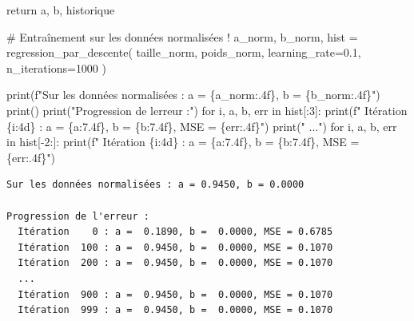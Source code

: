 \documentclass[
  french,
  11pt,
  a4paper,
]{scrbook}
\newenvironment{Shaded}{}{}
\newcommand{\BuiltInTok}[1]{\textcolor[rgb]{0.84,0.23,0.29}{#1}}
\newcommand{\CommentTok}[1]{\textcolor[rgb]{0.42,0.45,0.49}{#1}}
\newcommand{\ControlFlowTok}[1]{\textcolor[rgb]{0.84,0.23,0.29}{#1}}
\newcommand{\DecValTok}[1]{\textcolor[rgb]{0.00,0.36,0.77}{#1}}
\newcommand{\FloatTok}[1]{\textcolor[rgb]{0.00,0.36,0.77}{#1}}
\newcommand{\KeywordTok}[1]{\textcolor[rgb]{0.84,0.23,0.29}{#1}}
\newcommand{\NormalTok}[1]{\textcolor[rgb]{0.14,0.16,0.18}{#1}}
\newcommand{\OperatorTok}[1]{\textcolor[rgb]{0.14,0.16,0.18}{#1}}
\newcommand{\SpecialCharTok}[1]{\textcolor[rgb]{0.00,0.36,0.77}{#1}}
\newcommand{\SpecialStringTok}[1]{\textcolor[rgb]{0.01,0.18,0.38}{#1}}
\newcommand{\StringTok}[1]{\textcolor[rgb]{0.01,0.18,0.38}{#1}}
\begin{document}
\begin{Shaded}
\begin{Highlighting}[]
    \ControlFlowTok{return}\NormalTok{ a, b, historique}

\CommentTok{\# Entraînement sur les données normalisées !}
\NormalTok{a\_norm, b\_norm, hist }\OperatorTok{=}\NormalTok{ regression\_par\_descente(}
\NormalTok{    taille\_norm, poids\_norm, }
\NormalTok{    learning\_rate}\OperatorTok{=}\FloatTok{0.1}\NormalTok{,}
\NormalTok{    n\_iterations}\OperatorTok{=}\DecValTok{1000}
\NormalTok{)}

\BuiltInTok{print}\NormalTok{(}\SpecialStringTok{f"Sur les données normalisées : a = }\SpecialCharTok{\{}\NormalTok{a\_norm}\SpecialCharTok{:.4f\}}\SpecialStringTok{, b = }\SpecialCharTok{\{}\NormalTok{b\_norm}\SpecialCharTok{:.4f\}}\SpecialStringTok{"}\NormalTok{)}
\BuiltInTok{print}\NormalTok{()}
\BuiltInTok{print}\NormalTok{(}\StringTok{"Progression de l\textquotesingle{}erreur :"}\NormalTok{)}
\ControlFlowTok{for}\NormalTok{ i, a, b, err }\KeywordTok{in}\NormalTok{ hist[:}\DecValTok{3}\NormalTok{]:}
    \BuiltInTok{print}\NormalTok{(}\SpecialStringTok{f"  Itération }\SpecialCharTok{\{}\NormalTok{i}\SpecialCharTok{:4d\}}\SpecialStringTok{ : a = }\SpecialCharTok{\{}\NormalTok{a}\SpecialCharTok{:7.4f\}}\SpecialStringTok{, b = }\SpecialCharTok{\{}\NormalTok{b}\SpecialCharTok{:7.4f\}}\SpecialStringTok{, MSE = }\SpecialCharTok{\{}\NormalTok{err}\SpecialCharTok{:.4f\}}\SpecialStringTok{"}\NormalTok{)}
\BuiltInTok{print}\NormalTok{(}\StringTok{"  ..."}\NormalTok{)}
\ControlFlowTok{for}\NormalTok{ i, a, b, err }\KeywordTok{in}\NormalTok{ hist[}\OperatorTok{{-}}\DecValTok{2}\NormalTok{:]:}
    \BuiltInTok{print}\NormalTok{(}\SpecialStringTok{f"  Itération }\SpecialCharTok{\{}\NormalTok{i}\SpecialCharTok{:4d\}}\SpecialStringTok{ : a = }\SpecialCharTok{\{}\NormalTok{a}\SpecialCharTok{:7.4f\}}\SpecialStringTok{, b = }\SpecialCharTok{\{}\NormalTok{b}\SpecialCharTok{:7.4f\}}\SpecialStringTok{, MSE = }\SpecialCharTok{\{}\NormalTok{err}\SpecialCharTok{:.4f\}}\SpecialStringTok{"}\NormalTok{)}
\end{Highlighting}
\end{Shaded}

\begin{verbatim}
Sur les données normalisées : a = 0.9450, b = 0.0000

Progression de l'erreur :
  Itération    0 : a =  0.1890, b =  0.0000, MSE = 0.6785
  Itération  100 : a =  0.9450, b =  0.0000, MSE = 0.1070
  Itération  200 : a =  0.9450, b =  0.0000, MSE = 0.1070
  ...
  Itération  900 : a =  0.9450, b =  0.0000, MSE = 0.1070
  Itération  999 : a =  0.9450, b =  0.0000, MSE = 0.1070
\end{verbatim}
\end{document}
